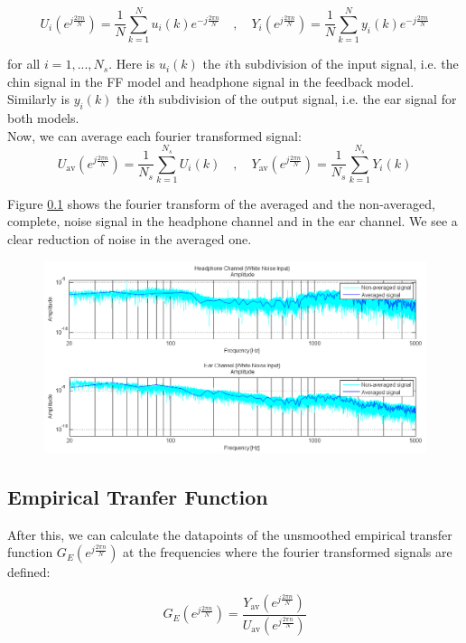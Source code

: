 \[U_i(e^{j\frac{2\pi n}{N}}) = \frac{1}{N}\sum\limits_{k = 1}^{N }u_i(k)e^{-j\frac{2\pi n}{N}} \quad, \quad Y_i(e^{j\frac{2\pi n}{N}}) = \frac{1}{N}\sum\limits_{k = 1}^{N }y_i(k)e^{-j\frac{2\pi n}{N}}\]

for all $i = 1, ..., N_s$. Here is $u_i(k)$ the $i$th subdivision of the input signal, i.e. the chin signal in the FF model and headphone signal in the feedback model. Similarly is $y_i(k)$ the $i$th subdivision of the output signal, i.e. the ear signal for both models. \\

Now, we can average each fourier transformed signal:
\[U_\text{av}(e^{j\frac{2\pi n}{N}}) = \frac{1}{N_s}\sum\limits_{k = 1}^{N_s }U_i(k) \quad, \quad Y_\text{av}(e^{j\frac{2\pi n}{N}}) = \frac{1}{N_s}\sum\limits_{k = 1}^{N_s} Y_i(k)\]

Figure \ref{} shows the fourier transform of the averaged and the non-averaged, complete, noise signal in the headphone channel and in the ear channel. We see a clear reduction of noise in the averaged one.

\begin{figure}[H]
\centering
\includegraphics[width=1.0\textwidth]{pics/averagedvsnonaveraged}
\caption{}
\label{pic:}
\end{figure}


\subsection{Empirical Tranfer Function}
After this, we can calculate the datapoints of the unsmoothed empirical transfer function $G_E(e^{j\frac{2\pi n}{N}})$ at the frequencies where the fourier transformed signals are defined:

\[G_E(e^{j\frac{2\pi n}{N}}) = \frac{Y_\text{av}(e^{j\frac{2\pi n}{N}})}{U_\text{av}(e^{j\frac{2\pi n}{N}})}\]


